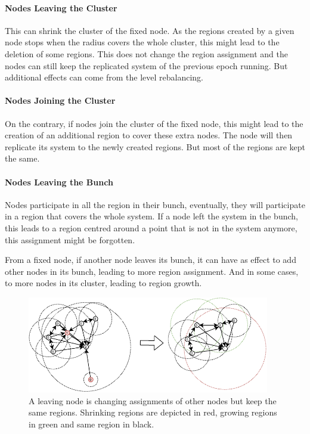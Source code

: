 \documentclass[a4paper,11pt,oneside]{report}
\begin{document}
\paragraph{Nodes Leaving the Cluster} 
This can shrink the cluster of the fixed node. As the regions created by a given node stops when
the radius covers the whole cluster, this might lead to the deletion of some
regions. This does not change the
region assignment and the nodes can still keep the replicated system of the
previous epoch running. But additional effects can come from the level rebalancing. 

\paragraph{Nodes Joining the Cluster} 
On the contrary, if nodes join the cluster of the fixed node, this might lead to the creation of
an additional region to cover these extra nodes. The node will then replicate its
system to the newly created regions. But most of the regions are kept the same.

\paragraph{Nodes Leaving the Bunch} 
Nodes participate in all the region in their bunch, eventually, they will
participate in a region that covers the whole system. If a node left the system
in the bunch, this leads to a region centred around a point that is not in
the system anymore, this assignment might be forgotten. 

From a fixed node, if another node leaves its bunch, it can have
as effect to add other nodes in its bunch, leading to more region assignment.
And in some cases, to more nodes in its cluster, leading to region growth. 

\begin{figure}[!h] 
\centering
\includegraphics[width=300pt]{figures/LocarnoTreaties-Leaving-cluster}
\caption{A leaving node is changing assignments of other
  nodes but keep the same regions. Shrinking regions are depicted in red,
  growing regions in green and same region in black. }
\label{fig:LocarnoTreaties-Leaving-cluster}
\end{figure}
\end{document}

